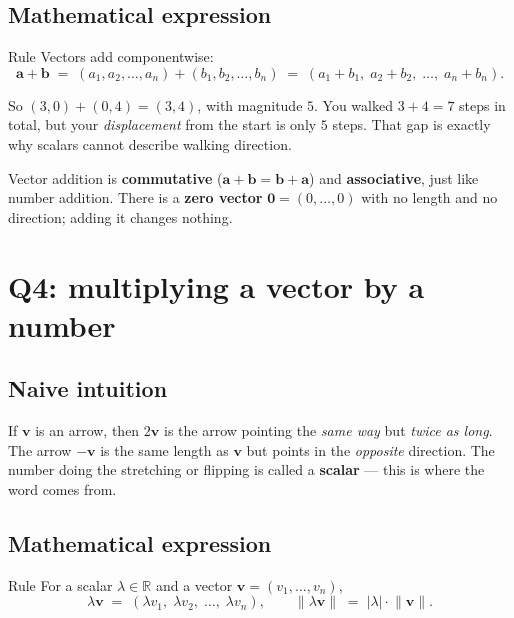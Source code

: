 \documentclass[11pt,a4paper]{article}
\newcommand{\vect}[1]{\boldsymbol{#1}}
\begin{document}
\subsection*{Mathematical expression}

\begin{mathblock}{Rule}
Vectors add componentwise:
\[
  \vect{a} + \vect{b}
  \;=\;
  (a_1, a_2, \dots, a_n) + (b_1, b_2, \dots, b_n)
  \;=\;
  (a_1+b_1,\; a_2+b_2,\; \dots,\; a_n+b_n).
\]
\end{mathblock}

So $(3,0) + (0,4) = (3,4)$, with magnitude $5$. You walked $3+4 = 7$ steps in total,
but your \emph{displacement} from the start is only $5$ steps. That gap is exactly
why scalars cannot describe walking direction.

Vector addition is \textbf{commutative} ($\vect{a}+\vect{b} = \vect{b}+\vect{a}$)
and \textbf{associative}, just like number addition. There is a \textbf{zero vector}
$\vect{0} = (0,\dots,0)$ with no length and no direction; adding it changes nothing.

\section{Q4: multiplying a vector by a number}

\subsection*{Naive intuition}

If $\vect{v}$ is an arrow, then $2\vect{v}$ is the arrow pointing the \emph{same way}
but \emph{twice as long}. The arrow $-\vect{v}$ is the same length as $\vect{v}$
but points in the \emph{opposite} direction. The number doing the stretching or flipping
is called a \textbf{scalar} --- this is where the word comes from.

\subsection*{Mathematical expression}

\begin{mathblock}{Rule}
For a scalar $\lambda \in \mathbb{R}$ and a vector $\vect{v} = (v_1,\dots,v_n)$,
\[
  \lambda \vect{v} \;=\; (\lambda v_1,\; \lambda v_2,\; \dots,\; \lambda v_n),
  \qquad
  \lVert \lambda \vect{v} \rVert \;=\; \lvert \lambda \rvert \cdot \lVert \vect{v} \rVert.
\]
\end{mathblock}
\end{document}
